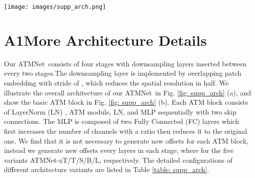 \documentclass[letterpaper]{article} \usepackage{aaai23v}  \usepackage{times}  \usepackage{helvet}  \usepackage{courier}  \usepackage[hyphens]{url}  \usepackage{graphicx} \urlstyle{rm} \def\UrlFont{\rm}  \usepackage{caption} \frenchspacing  \setlength{\pdfpagewidth}{8.5in}  \setlength{\pdfpageheight}{11in}  \usepackage{algorithm}
\newcommand{\ours}{{ATMNet}}
\newcommand{\oursxt}{ATMNet-xT}
\begin{document}
\clearpage
{
\small


}

\clearpage


\begin{figure*}[t]
	\centering
    \texttt{[image: images/supp\_arch.png]}
    \caption{
	a) The overall architecture of \ours. b) The ATM block.
	}
	\label{fig: supp_arch}
\end{figure*}


\section*{A1\quad More Architecture Details}


Our \ours~consists of four stages with downsampling layers inserted between every two stages.The downsampling layer is implemented by overlapping patch embedding \cite{wang2021pyramidpvt,wang2021pvtv2} with stride of , which reduces the spatial resolution in half. We illustrate the overall architecture of our \ours~in Fig. \ref{fig: supp_arch} (a), and show the basic ATM block in Fig. \ref{fig: supp_arch} (b). Each ATM block consists of LayerNorm (LN) \cite{ba2016LayerNorm}, ATM module, LN, and MLP sequentially with two skip connections. The MLP is composed of two Fully Connected (FC) layers which first increases the number of channels with a ratio  then reduces it to the original one. 
We find that it is not necessary to generate new offsets for each ATM block, instead we generate new offsets every  layers in each stage, where  for the five variants \oursxt/T/S/B/L, respectively. 
The detailed configurations of different architecture variants are listed in Table \ref{table: supp_arch}.
\end{document}
